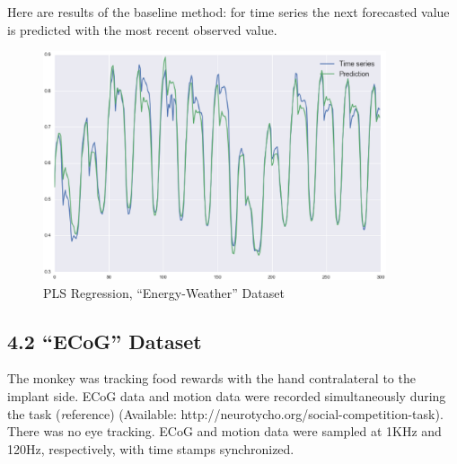 \documentclass[12pt,twoside]{article}
\begin{document}
	Here are results of the baseline method: for time series the next forecasted value is predicted with the most recent observed value.
	

	\begin{figure}[!h]
		\includegraphics[width=0.9\textwidth]{prediction_pls.eps}
	\caption{PLS Regression, ``Energy-Weather'' Dataset }
	\end{figure}

\subsection{4.2 ``ECoG'' Dataset }

	The monkey was tracking food rewards with the hand contralateral to the implant side. ECoG data and motion data were recorded simultaneously during the task ({\textit reference}) (Available: http://neurotycho.org/social-competition-task). There was no eye tracking. ECoG and motion data were sampled at 1KHz and 120Hz, respectively, with time stamps synchronized. 
\end{document}
